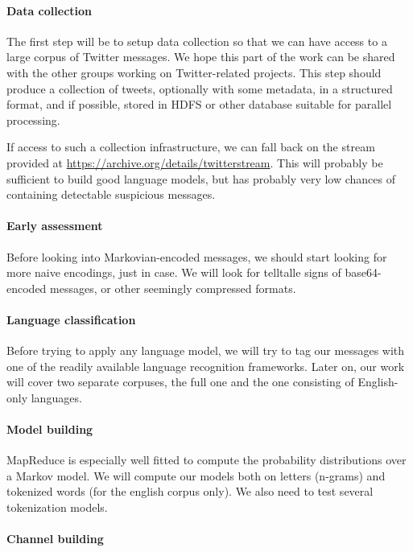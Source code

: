 \documentclass[a4paper,11pt]{article}
\begin{document}
\paragraph{Data collection}

The first step will be to setup data collection so that we can have access to a large corpus of Twitter messages. We hope this part of the work can be shared with the other groups working on Twitter-related projects. This step should produce a collection of tweets, optionally with some metadata, in a structured format, and if possible, stored in HDFS or other database suitable for parallel processing.

If access to such a collection infrastructure, we can fall back on the stream provided at \url{https://archive.org/details/twitterstream}. This will probably be sufficient to build good language models, but has probably very low chances of containing detectable suspicious messages.

\paragraph{Early assessment}

Before looking into Markovian-encoded messages, we should start looking for more naive encodings, just in case. We will look for telltalle signs of base64-encoded messages, or other seemingly compressed formats.

\paragraph{Language classification}

Before trying to apply any language model, we will try to tag our messages with one of the readily available language recognition frameworks. Later on, our work will cover two separate corpuses, the full one and the one consisting of English-only languages.

\paragraph{Model building}

MapReduce is especially well fitted to compute the probability distributions over a Markov model. We will compute our models both on letters (n-grams) and tokenized words (for the english corpus only). We also need to test several tokenization models.

\paragraph{Channel building}
\end{document}
